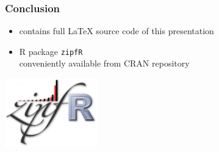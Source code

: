 \documentclass[t]{beamer} %
\begin{document}

\begin{frame}
  \frametitle{Conclusion}

  \gap[1]
  
  \begin{center}
  \end{center}

  \gap[2]
  
  \begin{itemize}
  \item contains full \LaTeX{} source code of this presentation
  \item R package \texttt{zipfR} \citep{Evert:Baroni:07}\\ conveniently available from CRAN repository
  \end{itemize}

  \begin{flushright}
    \includegraphics[width=4cm]{img/zipfR_logo}
  \end{flushright}
\end{frame}
\end{document}
